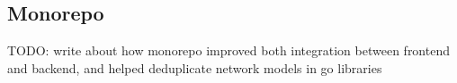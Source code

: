 \subsection{Monorepo}\label{sec:monorepo}

TODO: write about how monorepo improved
both integration between frontend and backend,
and helped deduplicate network models in go libraries
